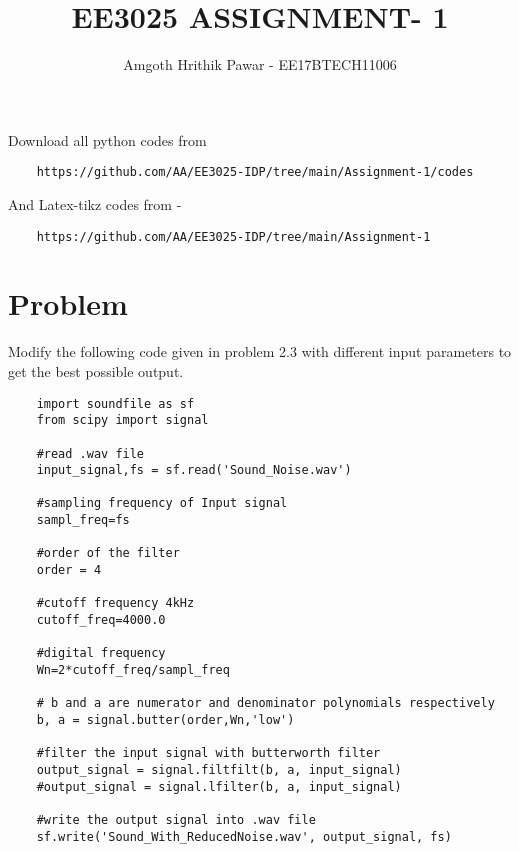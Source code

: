 \documentclass[journal,12pt,twocolumn]{IEEEtran}
\begin{document}
	\def\putbox#1#2#3{\makebox[0in][l]{\makebox[#1][l]{}\raisebox{\baselineskip}[0in][0in]{\raisebox{#2}[0in][0in]{#3}}}}
	\def\rightbox#1{\makebox[0in][r]{#1}}
	\def\centbox#1{\makebox[0in]{#1}}
	\def\topbox#1{\raisebox{-\baselineskip}[0in][0in]{#1}}
	\def\midbox#1{\raisebox{-0.5\baselineskip}[0in][0in]{#1}}
	\vspace{3cm}
	\title{EE3025 ASSIGNMENT- 1}
	\author{Amgoth Hrithik Pawar - EE17BTECH11006}
	\maketitle
	\newpage
	\bigskip
	\renewcommand{\thefigure}{\theenumi}
	\renewcommand{\thetable}{\theenumi}
	Download all python codes from 
	\begin{lstlisting}
	https://github.com/AA/EE3025-IDP/tree/main/Assignment-1/codes
	\end{lstlisting}
	And Latex-tikz codes from - 
	\begin{lstlisting}
	https://github.com/AA/EE3025-IDP/tree/main/Assignment-1
	\end{lstlisting}
	\section{\textbf{Problem}}
	
	Modify the following code given in problem 2.3 with different input parameters to get the best possible output.
	\begin{lstlisting}
	import soundfile as sf
	from scipy import signal
	
	#read .wav file
	input_signal,fs = sf.read('Sound_Noise.wav')
	
	#sampling frequency of Input signal
	sampl_freq=fs
	
	#order of the filter
	order = 4
	
	#cutoff frequency 4kHz
	cutoff_freq=4000.0
	
	#digital frequency
	Wn=2*cutoff_freq/sampl_freq
	
	# b and a are numerator and denominator polynomials respectively
	b, a = signal.butter(order,Wn,'low')
	
	#filter the input signal with butterworth filter
	output_signal = signal.filtfilt(b, a, input_signal)
	#output_signal = signal.lfilter(b, a, input_signal)
	
	#write the output signal into .wav file
	sf.write('Sound_With_ReducedNoise.wav', output_signal, fs)
	
	\end{lstlisting}
\end{document}
